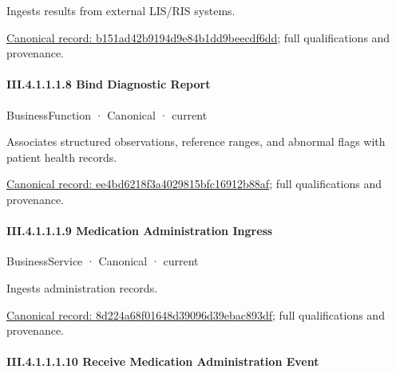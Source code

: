 Ingests results from external LIS/RIS systems.


{\footnotesize \href{../../../../../../../../continuum/business/business-service/b151ad42b9194d9e84b1dd9beecdf6dd.md}{Canonical record: b151ad42b9194d9e84b1dd9beecdf6dd}; full qualifications and provenance.}\par
\paragraph*{III.4.1.1.1.8 Bind Diagnostic Report}
\label{navigation:III.4.1.1.1.8}

\label{element:ee4bd6218f3a4029815bfc16912b88af}
{\small BusinessFunction · Canonical · current}\par

Associates structured observations, reference ranges, and abnormal flags with patient health records.


{\footnotesize \href{../../../../../../../../continuum/business/business-function/ee4bd6218f3a4029815bfc16912b88af.md}{Canonical record: ee4bd6218f3a4029815bfc16912b88af}; full qualifications and provenance.}\par
\paragraph*{III.4.1.1.1.9 Medication Administration Ingress}
\label{navigation:III.4.1.1.1.9}

\label{element:8d224a68f01648d39096d39ebac893df}
{\small BusinessService · Canonical · current}\par

Ingests administration records.


{\footnotesize \href{../../../../../../../../continuum/business/business-service/8d224a68f01648d39096d39ebac893df.md}{Canonical record: 8d224a68f01648d39096d39ebac893df}; full qualifications and provenance.}\par
\paragraph*{III.4.1.1.1.10 Receive Medication Administration Event}
\label{navigation:III.4.1.1.1.10}

